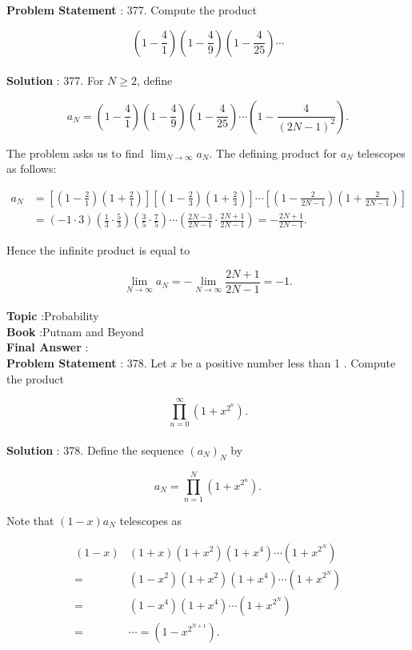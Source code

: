 \documentclass[10pt]{article}
\begin{document}
\textbf{Problem Statement} :
377. Compute the product

$$
\left(1-\frac{4}{1}\right)\left(1-\frac{4}{9}\right)\left(1-\frac{4}{25}\right) \cdots
$$
\\
\textbf{Solution} :
377. For $N \geq 2$, define

$$
a_{N}=\left(1-\frac{4}{1}\right)\left(1-\frac{4}{9}\right)\left(1-\frac{4}{25}\right) \cdots\left(1-\frac{4}{(2 N-1)^{2}}\right) .
$$

The problem asks us to find $\lim _{N \rightarrow \infty} a_{N}$. The defining product for $a_{N}$ telescopes as follows:

$$
\begin{aligned}
a_{N} &=\left[\left(1-\frac{2}{1}\right)\left(1+\frac{2}{1}\right)\right]\left[\left(1-\frac{2}{3}\right)\left(1+\frac{2}{3}\right)\right] \cdots\left[\left(1-\frac{2}{2 N-1}\right)\left(1+\frac{2}{2 N-1}\right)\right] \\
&=(-1 \cdot 3)\left(\frac{1}{3} \cdot \frac{5}{3}\right)\left(\frac{3}{5} \cdot \frac{7}{5}\right) \cdots\left(\frac{2 N-3}{2 N-1} \cdot \frac{2 N+1}{2 N-1}\right)=-\frac{2 N+1}{2 N-1} .
\end{aligned}
$$

Hence the infinite product is equal to

$$
\lim _{N \rightarrow \infty} a_{N}=-\lim _{N \rightarrow \infty} \frac{2 N+1}{2 N-1}=-1 .
$$
\\
\textbf{Topic} :Probability\\
\textbf{Book} :Putnam and Beyond\\
\textbf{Final Answer} :\\


\textbf{Problem Statement} :
378. Let $x$ be a positive number less than 1 . Compute the product

$$
\prod_{n=0}^{\infty}\left(1+x^{2^{n}}\right) .
$$
\\
\textbf{Solution} :
378. Define the sequence $\left(a_{N}\right)_{N}$ by

$$
a_{N}=\prod_{n=1}^{N}\left(1+x^{2^{n}}\right) .
$$

Note that $(1-x) a_{N}$ telescopes as

$$
\begin{aligned}
(1-x) &(1+x)\left(1+x^{2}\right)\left(1+x^{4}\right) \cdots\left(1+x^{2^{N}}\right) \\
=&\left(1-x^{2}\right)\left(1+x^{2}\right)\left(1+x^{4}\right) \cdots\left(1+x^{2^{N}}\right) \\
=&\left(1-x^{4}\right)\left(1+x^{4}\right) \cdots\left(1+x^{2^{N}}\right) \\
=& \cdots=\left(1-x^{2^{N+1}}\right) .
\end{aligned}
$$
\end{document}
